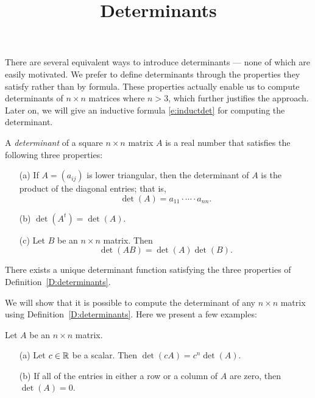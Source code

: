 \documentclass{ximera}
\title{Determinants}
\begin{document}
\begin{abstract}
\end{abstract}
\maketitle

 
\label{S:det}
 
There are several equivalent ways to introduce determinants --- none of which 
are easily motivated.  We prefer to define determinants through the properties 
they satisfy rather than by formula.  These properties actually enable us to 
compute determinants of $n\times n$ matrices where $n>3$, which further 
justifies the approach. Later on, we will give an inductive formula 
\eqref{e:inductdet} for computing the determinant. 
 
\begin{definition}  \label{D:determinants}
A {\em determinant\/} of a square $n\times n$ matrix $A$ is a real
number that satisfies the following three properties:
\begin{itemize} 
\item[(a)]  If $A=(a_{ij})$ is lower 
triangular, then
the determinant of $A$ is the product of the diagonal entries;
that is,
\[
\det(A) = a_{11}\cdot\cdots\cdot a_{nn}.
\]
\item[(b)]  $\det(A^t)=\det(A)$.
\item[(c)]  Let $B$ be an $n\times n$ matrix.  
Then
\begin{equation} \label{e:detproduct}
\det(AB) = \det(A)\det(B).
\end{equation}
\end{itemize}
\end{definition} 

\begin{theorem}  \label{T:determinants}
There exists a unique determinant function satisfying the three
properties of Definition~\ref{D:determinants}.
\end{theorem}

We will show that it is possible to compute the determinant of
any $n\times n$ matrix using Definition~\ref{D:determinants}.
Here we present a few examples:

\begin{lemma}
Let $A$ be an $n\times n$ matrix.
\begin{itemize}
\item[(a)]   Let $c\in\mbox{$\Bbb{R}$}$ be a scalar.  Then $\det(cA) = c^n\det(A)$.
\item[(b)] If all of the entries in either a row or a column of $A$ are 
zero, then $\det(A)=0$.
\end{itemize}
\end{lemma}
\end{document}
